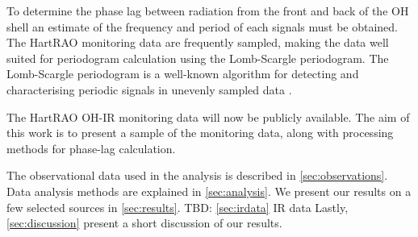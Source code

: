 To determine the phase lag between radiation from the front and back of the OH shell an estimate of the frequency and period of each signals must be obtained.
The HartRAO monitoring data are frequently sampled, making the data well suited for periodogram calculation using the Lomb-Scargle periodogram.
The Lomb-Scargle periodogram is a well-known algorithm for detecting and characterising periodic signals in unevenly sampled data
\citep{2018ApJS..236...16V}.

The HartRAO OH-IR monitoring data will now be publicly available.
The aim of this work is to present a sample of the monitoring data, along with processing methods for phase-lag calculation.

The observational data used in the analysis is described in \cref{sec:observations}.
Data analysis methods are explained in \cref{sec:analysis}.
We present our results on a few selected sources in \cref{sec:results}.
{\color {red}
TBD: \cref{sec:irdata} IR data
}
Lastly, \cref{sec:discussion} present a short discussion of our results.
